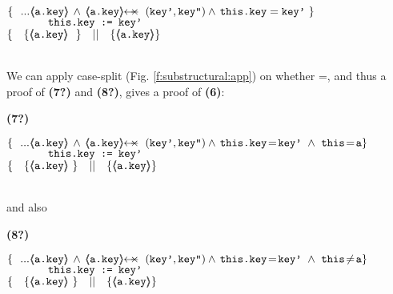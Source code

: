 \begin{example}
{{\begin{minipage}{.95\textwidth}
\begin{flushleft}
$\{ \  \   ...    {\inside{\prg{a.key}}} \, \wedge \, \protectedFrom {\prg{a.key}} {(\prg{key'},\prg{key''})}  \wedge  \,  \prg{this.key}=\prg{key'}\  \} \ $\\
$\ \ \ \ \ \ \ \ \ \ \  \mbox{\normalfont{\texttt{this.key := key'}}}\   $\\
$  \{\  \ \   \{ {\inside{\prg{a.key}}}\   \   \} \ \ \  || \ \ \   \{ {\inside{\prg{a.key}}} \}  $ 
\end{flushleft}
\end{minipage}
}}
\\
 \vspace{.03cm}
\noindent
We can apply case-split  (\cf Fig. \ref{f:substructural:app}) on whether =, and thus a proof of \textbf{(7?)} and \textbf{(8?)}, gives a proof of \textbf{(6)}:\\
 \vspace{.03cm}
{\small{  \begin{minipage}{.05\textwidth}
   \textbf{(7?)}\ \ 
\end{minipage}
\hfill
\begin{minipage}{.95\textwidth}
\begin{flushleft}
$\{ \  \   ...    {\inside{\prg{a.key}}} \, \wedge \, \protectedFrom {\prg{a.key}} {(\prg{key'},\prg{key''})} \wedge  \,  \prg{this.key}\!=\!\prg{key'}\ \wedge\ \prg{this}\!=\!\prg{a}  \} \ $\\
$\ \ \ \ \ \ \ \ \ \ \   \mbox{\normalfont{\texttt{this.key := key'}}}\    $\\
$  \{\  \ \   \{ {\inside{\prg{a.key}}}  \   \} \ \ \  || \ \ \     \{ {\inside{\prg{a.key}}} \}  $ 
\end{flushleft}
\end{minipage}
}}
\\
and also
\\
 \vspace{.03cm}
{\small{  \begin{minipage}{.05\textwidth}
   \textbf{(8?)}\ \ 
\end{minipage}
\hfill
\begin{minipage}{.95\textwidth}
\begin{flushleft}
$\{ \  \   ...   {\inside{\prg{a.key}}} \, \wedge \, \protectedFrom {\prg{a.key}} {(\prg{key'},\prg{key''})}  \wedge  \,  \prg{this.key}\!=\!\prg{key'}\ \wedge\ \prg{this}\!\neq\!\prg{a}  \} \ $\\
$\ \ \ \ \ \ \ \ \ \ \  \mbox{\normalfont{\texttt{this.key := key'}}}\   $\\
$  \{\  \ \   \{ {\inside{\prg{a.key}}}  \   \} \ \ \  || \ \ \     \{ {\inside{\prg{a.key}}} \}  $ 

\end{flushleft}
\end{minipage}}}
\end{example}

